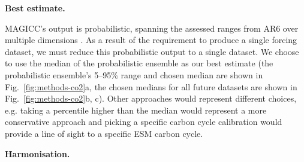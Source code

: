 \textbf{Best estimate.}

MAGICC's output is probabilistic, spanning the assessed ranges from AR6 over multiple dimensions \citep{IPCC_AR6-WG1-Ch-7_2021,IPCC_AR6-WG1-Ch-7-SM_2021}.
As a result of the requirement to produce a single forcing dataset,
we must reduce this probabilistic output to a single dataset.
We choose to use the median of the probabilistic ensemble as our best estimate
(the probabilistic ensemble's 5--95\% range and chosen median are shown in Fig.~\ref{fig:methods-co2}a,
the chosen medians for all future datasets are shown in Fig.~\ref{fig:methods-co2}b, c).
Other approaches would represent different choices,
e.g. taking a percentile higher than the median would represent a more conservative approach
and picking a specific carbon cycle calibration \citep[as done in][]{meinshausen_ssp-ghgs_2020}
would provide a line of sight to a specific ESM carbon cycle.

\textbf{Harmonisation.}


